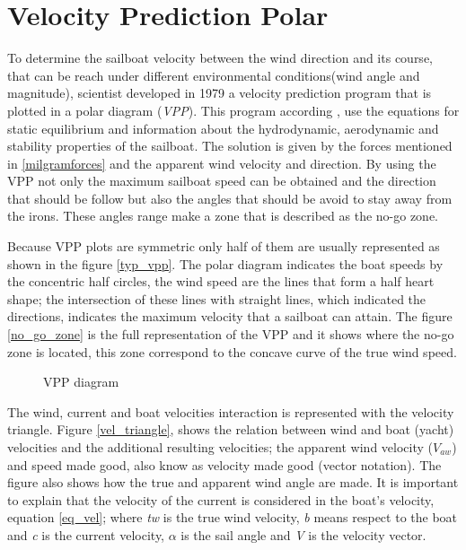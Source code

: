 \section{Velocity Prediction Polar}
To determine the sailboat velocity between the wind direction and its course, that can be reach under different environmental conditions(wind angle and magnitude), scientist developed in 1979 a velocity prediction program that is plotted in a polar diagram (\textit{VPP}). This program according  \cite{larsonprinciples}, use the equations for static equilibrium and information about the hydrodynamic, aerodynamic and stability properties of the sailboat.  The solution is given by  the forces mentioned in \ref{milgramforces} and the apparent wind velocity and direction. By using the VPP not only the maximum sailboat speed can be obtained and the direction that should be follow but also the angles that should be avoid to stay away from the irons\cite{yang2011control}. These angles range make a zone that is described as the no-go zone.\par 

Because VPP plots are symmetric only half of them are usually represented as shown in the figure \ref {typ_vpp}. The polar diagram indicates the boat speeds by the concentric half circles, the wind speed are the lines that form a half heart shape; the intersection of these lines with straight lines, which indicated the directions, indicates the maximum velocity that a sailboat can attain. The figure \ref{no_go_zone} is the full representation of the VPP and it shows where the no-go zone is located, this zone correspond to the concave curve of the true wind speed.\par 

\begin{figure} %
  \centering
  \hfill
  \caption{VPP diagram}
\label{vpp_diag} 
\end{figure}

The wind, current and boat velocities interaction is represented with the velocity triangle.  Figure \ref{vel_triangle}, shows the relation between wind and boat (yacht) velocities and the additional resulting velocities; the apparent wind velocity ($V_{aw}$) and speed made good,  also know as velocity made good (vector notation). The figure also shows how the true and apparent wind angle are made. It is important to explain that the velocity of the current is considered in the boat's velocity, equation \ref{eq_vel}; where \textit{tw} is the true wind velocity, \textit{b} means respect to the boat and \textit{c} is the current velocity, $\alpha$ is the sail angle and \textit{V} is the velocity vector. \par 

